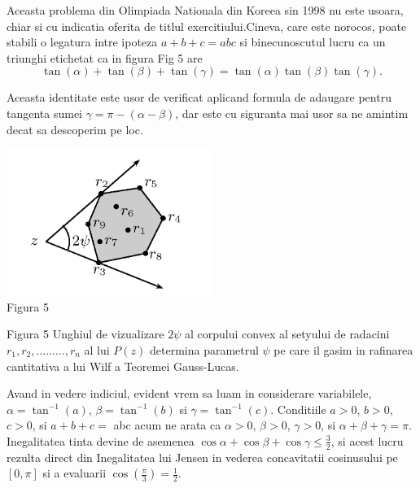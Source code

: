 \documentclass[a4paper,12pt,oneside]{report}
\begin{document}
Aceasta problema din Olimpiada Nationala din Koreea sin 1998 nu este usoara, chiar si cu indicatia oferita de titlul exercitiului.Cineva, care este norocos, poate stabili o legatura intre  ipoteza \(a + b + c = abc\) si binecunoscutul lucru ca un triunghi etichetat ca in figura Fig 5 
 are 
 \begin{displaymath}
   \tan\left ( \alpha  \right ) + \tan\left ( \beta   \right ) + \tan\left ( \gamma   \right ) = \tan\left ( \alpha  \right )\tan\left ( \beta   \right )\tan\left ( \gamma   \right ). 
 \end{displaymath}

Aceasta identitate este usor de verificat aplicand formula de adaugare pentru tangenta sumei \(\gamma  = \pi  - \left ( \alpha  - \beta  \right )\), dar este cu siguranta mai usor sa ne amintim decat sa descoperim pe loc. 


\begin{center}
	\includegraphics[width=0.5\textwidth]{fig_pb14.png}
	\\ Figura 5
\end{center}


Figura 5  Unghiul de vizualizare \(2\psi\) al corpului convex al setyului de radacini \(r_{1} , r_{2} , ........., r_{n}\) al lui \(P\left ( z \right )\) determina parametrul \(\psi\) pe care il gasim in rafinarea cantitativa a lui Wilf a Teoremei Gauss-Lucas. 

Avand in vedere indiciul, evident vrem sa luam in considerare variabilele,  \(\alpha  = \tan^{-1}\left ( a \right )\), \(\beta = \tan ^{-1}\left ( b \right )\) si \(\gamma  = \tan ^{-1}\left ( c \right )\). Conditiile \(a> 0\), \(b> 0\), \(c> 0\), si \(a+b+c =\) abc acum ne arata ca \(\alpha > 0 \), \(\beta > 0 \), \(\gamma > 0\), si \(\alpha + \beta + \gamma  = \pi\). Inegalitatea tinta devine de asemenea \(\cos \alpha  + \cos \beta  + \cos \gamma  \leq \frac{3}{2}\), si acest lucru rezulta direct din Inegalitatea lui Jensen  in vederea concavitatii cosinusului pe \(\left [ 0 , \pi  \right ]\)  si a evaluarii \(\cos \left ( \frac{\pi }{3} \right ) = \frac{1}{2}\). 
\end{document}
